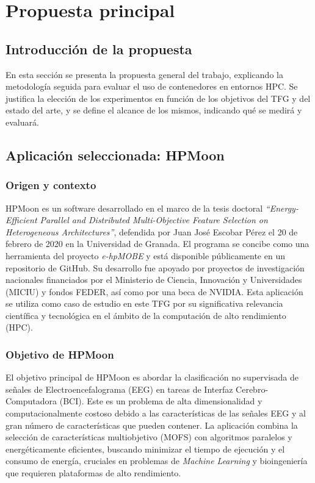 \chapter{Propuesta principal}\label{cap:propuesta}


\section{Introducción de la propuesta}\label{sec:introduccion_propuesta}
En esta sección se presenta la propuesta general del trabajo, explicando la metodología seguida para evaluar el uso de contenedores en entornos HPC. Se justifica la elección de los experimentos en función de los objetivos del TFG y del estado del arte, y se define el alcance de los mismos, indicando qué se medirá y evaluará.

\section{Aplicación seleccionada: HPMoon}\label{sec:hpm_application}

\subsection{Origen y contexto}\label{subsec:hpm_origen}
HPMoon es un software desarrollado en el marco de la tesis doctoral \textit{``Energy-Efficient Parallel and Distributed Multi-Objective Feature Selection on Heterogeneous Architectures''}, defendida por Juan José Escobar Pérez el 20 de febrero de 2020 en la Universidad de Granada. El programa se concibe como una herramienta del proyecto \textit{e-hpMOBE} y está disponible públicamente en un repositorio de GitHub. Su desarrollo fue apoyado por proyectos de investigación nacionales financiados por el Ministerio de Ciencia, Innovación y Universidades (MICIU) y fondos FEDER, así como por una beca de NVIDIA. Esta aplicación se utiliza como caso de estudio en este TFG por su significativa relevancia científica y tecnológica en el ámbito de la computación de alto rendimiento (\acs{HPC}).

\subsection{Objetivo de HPMoon}\label{subsec:hpm_objetivo}
El objetivo principal de HPMoon es abordar la clasificación no supervisada de señales de Electroencefalograma (\acs{EEG}) en tareas de Interfaz Cerebro-Computadora (\acs{BCI}). Este es un problema de alta dimensionalidad y computacionalmente costoso debido a las características de las señales \acs{EEG} y al gran número de características que pueden contener. La aplicación combina la selección de características multiobjetivo (\acs{MOFS}) con algoritmos paralelos y energéticamente eficientes, buscando minimizar el tiempo de ejecución y el consumo de energía, cruciales en problemas de \textit{Machine Learning} y bioingeniería que requieren plataformas de alto rendimiento.

